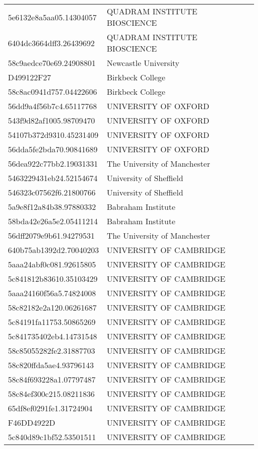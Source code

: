 \begin{tabular}{ll}
5e6132e8a5aa05.14304057 & QUADRAM INSTITUTE BIOSCIENCE \\
6404dc3664dff3.26439692 & QUADRAM INSTITUTE BIOSCIENCE \\
58c9aedce70e69.24908801 & Newcastle University \\
D499122F27 & Birkbeck College \\
58c8ac0941d757.04422606 & Birkbeck College \\
56dd9a4f56b7c4.65117768 & UNIVERSITY OF OXFORD \\
543f9d82af1005.98709470 & UNIVERSITY OF OXFORD \\
54107b372d9310.45231409 & UNIVERSITY OF OXFORD \\
56dda5fe2bda70.90841689 & UNIVERSITY OF OXFORD \\
56dea922c77bb2.19031331 & The University of Manchester \\
5463229431eb24.52154674 & University of Sheffield \\
546323c07562f6.21800766 & University of Sheffield \\
5a9e8f12a84b38.97880332 & Babraham Institute \\
58bda42e26a5e2.05411214 & Babraham Institute \\
56dff2079e9b61.94279531 & The University of Manchester \\
640b75ab1392d2.70040203 & UNIVERSITY OF CAMBRIDGE \\
5aaa24abf0c081.92615805 & UNIVERSITY OF CAMBRIDGE \\
5c841812b83610.35103429 & UNIVERSITY OF CAMBRIDGE \\
5aaa24160f56a5.74824008 & UNIVERSITY OF CAMBRIDGE \\
58c82182e2a120.06261687 & UNIVERSITY OF CAMBRIDGE \\
5c84191fa11753.50865269 & UNIVERSITY OF CAMBRIDGE \\
5c841735402eb4.14731548 & UNIVERSITY OF CAMBRIDGE \\
58c85055282fe2.31887703 & UNIVERSITY OF CAMBRIDGE \\
58c820ffda5ae4.93796143 & UNIVERSITY OF CAMBRIDGE \\
58c84f693228a1.07797487 & UNIVERSITY OF CAMBRIDGE \\
58c84ef300c215.08211836 & UNIVERSITY OF CAMBRIDGE \\
65df8ef0291fe1.31724904 & UNIVERSITY OF CAMBRIDGE \\
F46DD4922D & UNIVERSITY OF CAMBRIDGE \\
5c840d89c1bf52.53501511 & UNIVERSITY OF CAMBRIDGE \\

\end{tabular}
